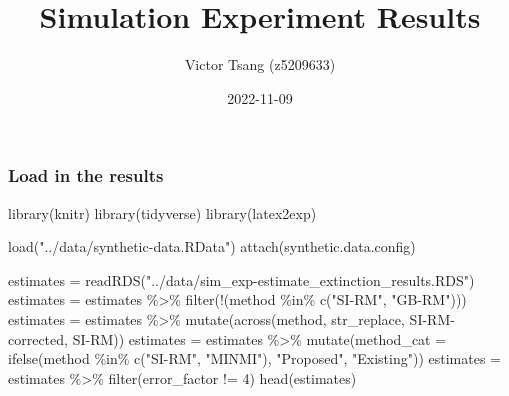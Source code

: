 \documentclass[
]{article}
\title{Simulation Experiment Results}
\author{Victor Tsang (z5209633)}
\date{2022-11-09}
\newenvironment{Shaded}{\begin{snugshade}}{\end{snugshade}}
\newcommand{\AttributeTok}[1]{\textcolor[rgb]{0.77,0.63,0.00}{#1}}
\newcommand{\DecValTok}[1]{\textcolor[rgb]{0.00,0.00,0.81}{#1}}
\newcommand{\FunctionTok}[1]{\textcolor[rgb]{0.00,0.00,0.00}{#1}}
\newcommand{\NormalTok}[1]{#1}
\newcommand{\OtherTok}[1]{\textcolor[rgb]{0.56,0.35,0.01}{#1}}
\newcommand{\SpecialCharTok}[1]{\textcolor[rgb]{0.00,0.00,0.00}{#1}}
\newcommand{\StringTok}[1]{\textcolor[rgb]{0.31,0.60,0.02}{#1}}
\begin{document}
\maketitle

\hypertarget{load-in-the-results}{%
\subsubsection{Load in the results}\label{load-in-the-results}}

\begin{Shaded}
\begin{Highlighting}[]
\FunctionTok{library}\NormalTok{(knitr)}
\FunctionTok{library}\NormalTok{(tidyverse)}
\FunctionTok{library}\NormalTok{(latex2exp)}

\FunctionTok{load}\NormalTok{(}\StringTok{"../data/synthetic{-}data.RData"}\NormalTok{)}
\FunctionTok{attach}\NormalTok{(synthetic.data.config)}

\NormalTok{estimates }\OtherTok{=} \FunctionTok{readRDS}\NormalTok{(}\StringTok{"../data/sim\_exp{-}estimate\_extinction\_results.RDS"}\NormalTok{)}
\NormalTok{estimates }\OtherTok{=}\NormalTok{ estimates }\SpecialCharTok{\%\textgreater{}\%} \FunctionTok{filter}\NormalTok{(}\SpecialCharTok{!}\NormalTok{(method }\SpecialCharTok{\%in\%} \FunctionTok{c}\NormalTok{(}\StringTok{"SI{-}RM"}\NormalTok{, }\StringTok{"GB{-}RM"}\NormalTok{)))}
\NormalTok{estimates }\OtherTok{=}\NormalTok{ estimates }\SpecialCharTok{\%\textgreater{}\%} \FunctionTok{mutate}\NormalTok{(}\FunctionTok{across}\NormalTok{(method, str\_replace, }\StringTok{\textquotesingle{}SI{-}RM{-}corrected\textquotesingle{}}\NormalTok{, }\StringTok{\textquotesingle{}SI{-}RM\textquotesingle{}}\NormalTok{))}
\NormalTok{estimates }\OtherTok{=}\NormalTok{ estimates }\SpecialCharTok{\%\textgreater{}\%} \FunctionTok{mutate}\NormalTok{(}\AttributeTok{method\_cat =} \FunctionTok{ifelse}\NormalTok{(method }\SpecialCharTok{\%in\%} \FunctionTok{c}\NormalTok{(}\StringTok{"SI{-}RM"}\NormalTok{, }\StringTok{"MINMI"}\NormalTok{), }\StringTok{"Proposed"}\NormalTok{, }\StringTok{"Existing"}\NormalTok{))}
\NormalTok{estimates }\OtherTok{=}\NormalTok{ estimates }\SpecialCharTok{\%\textgreater{}\%} \FunctionTok{filter}\NormalTok{(error\_factor }\SpecialCharTok{!=} \DecValTok{4}\NormalTok{)}
\FunctionTok{head}\NormalTok{(estimates)}
\end{Highlighting}
\end{Shaded}
\end{document}
